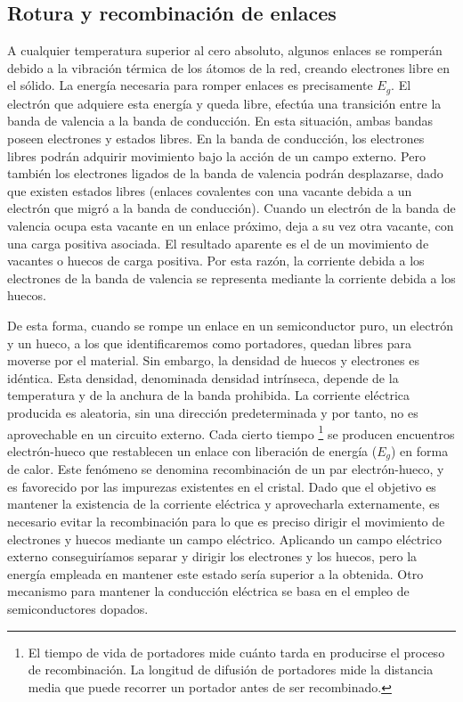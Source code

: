 \subsection{Rotura y recombinación de enlaces}

A cualquier temperatura superior al cero absoluto, algunos enlaces
se romperán debido a la vibración térmica de los átomos de la red,
creando electrones libre en el sólido. La energía necesaria para romper
enlaces es precisamente $E_{g}$. El electrón que adquiere esta energía
y queda libre, efectúa una transición entre la banda de valencia a
la banda de conducción. En esta situación, ambas bandas poseen electrones
y estados libres. En la banda de conducción, los electrones libres
podrán adquirir movimiento bajo la acción de un campo externo. Pero
también los electrones ligados de la banda de valencia podrán desplazarse,
dado que existen estados libres (enlaces covalentes con una vacante
debida a un electrón que migró a la banda de conducción). Cuando un
electrón de la banda de valencia ocupa esta vacante en un enlace próximo,
deja a su vez otra vacante, con una carga positiva asociada. El resultado
aparente es el de un movimiento de vacantes o huecos de carga positiva.
Por esta razón, la corriente debida a los electrones de la banda de
valencia se representa mediante la corriente debida a los huecos.

De esta forma, cuando se rompe un enlace en un semiconductor puro,
un electrón y un hueco, a los que identificaremos como portadores,
quedan libres para moverse por el material. Sin embargo, la densidad
de huecos y electrones es idéntica. Esta densidad, denominada densidad
intrínseca, depende de la temperatura y de la anchura de la banda
prohibida. La corriente eléctrica producida es aleatoria, sin una
dirección predeterminada y por tanto, no es aprovechable en un circuito
externo. Cada cierto tiempo%
\footnote{El tiempo de vida de portadores mide cuánto tarda en producirse el
proceso de recombinación. La longitud de difusión de portadores mide
la distancia media que puede recorrer un portador antes de ser recombinado.%
} se producen encuentros electrón-hueco que restablecen un enlace con
liberación de energía ($E_{g}$) en forma de calor. Este fenómeno
se denomina recombinación de un par electrón-hueco, y es favorecido
por las impurezas existentes en el cristal. Dado que el objetivo es
mantener la existencia de la corriente eléctrica y aprovecharla externamente,
es necesario evitar la recombinación para lo que es preciso dirigir
el movimiento de electrones y huecos mediante un campo eléctrico.
Aplicando un campo eléctrico externo conseguiríamos separar y dirigir
los electrones y los huecos, pero la energía empleada en mantener
este estado sería superior a la obtenida. Otro mecanismo para mantener
la conducción eléctrica se basa en el empleo de semiconductores dopados.


